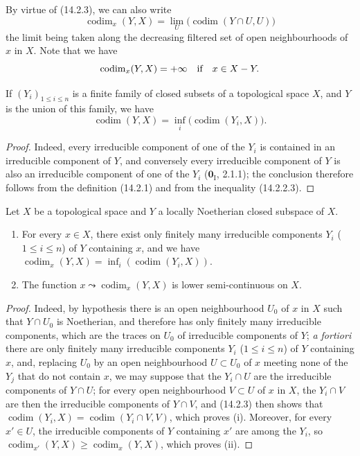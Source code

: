By virtue of (14.2.3), we can also write
\[
  \operatorname{codim}_x(Y,X)=
  \lim_U\bigl(\operatorname{codim}(Y\cap U,U)\bigr)
  \tag{14.2.4.1}\label{0.14.2.4.1}
\]
the limit being taken along the decreasing filtered set of open
neighbourhoods of $x$ in $X$. Note that we have
\[
  \operatorname{codim}_x(Y,X)=+\infty\quad\text{if}\quad x\in X- Y.
\]

\begin{proposition}[14.2.5]
\label{0.14.2.5}
If $(Y_i)_{1\leq i\leq n}$ is a finite family of closed subsets of a
topological space $X$, and $Y$ is the union of this family, we have
\[
  \operatorname{codim}(Y,X)=
  \inf_i\bigl(\operatorname{codim}(Y_i,X)\bigr).
  \tag{14.2.5.1}\label{0.14.2.5.1}
\]
\end{proposition}

\begin{proof}
Indeed, every irreducible component of one of the $Y_i$ is contained in
an irreducible component of $Y$, and conversely every irreducible
component of $Y$ is also an irreducible component of one of the $Y_i$
($\mathbf{0}_{\mathrm I}$, 2.1.1); the conclusion therefore follows from the definition
(14.2.1) and from the inequality (14.2.2.3).
\end{proof}

\begin{corollary}[14.2.6]
\label{0.14.2.6}
Let $X$ be a topological space and $Y$ a locally Noetherian closed
subspace of $X$.
\begin{enumerate}
  \item[\rm(i)] For every $x\in X$, there exist only finitely many
  irreducible components $Y_i$ \textup{($1\leq i\leq n$)} of $Y$ containing $x$,
  and we have
  $\operatorname{codim}_x(Y,X)=
  \inf_i(\operatorname{codim}(Y_i,X))$.
  \item[\rm(ii)] The function
  $x\leadsto\operatorname{codim}_x(Y,X)$ is lower semi-continuous
  on $X$.
\end{enumerate}
\end{corollary}

\begin{proof}
Indeed, by hypothesis there is an open neighbourhood $U_0$ of $x$ in $X$ such
that $Y\cap U_0$ is Noetherian, and therefore has only finitely many irreducible
components, which are the traces on $U_0$ of irreducible components of $Y$;
\emph{a fortiori} there are only finitely many irreducible components
$Y_i$ ($1\leq i\leq n$) of $Y$ containing $x$, and, replacing $U_0$
by an open neighbourhood $U\subset U_0$ of $x$ meeting none of the $Y_j$
that do not contain $x$, we may suppose that the $Y_i\cap U$ are the irreducible
components of $Y\cap U$; for every open neighbourhood $V\subset U$ of $x$
in $X$, the $Y_i\cap V$ are then the irreducible components of
$Y\cap V$, and (14.2.3) then shows that
$\operatorname{codim}(Y_i,X)=\operatorname{codim}(Y_i\cap V,V)$, which
proves (i). Moreover, for every $x'\in U$, the irreducible components of
$Y$ containing $x'$ are among the $Y_i$, so
$\operatorname{codim}_{x'}(Y,X)\geq\operatorname{codim}_x(Y,X)$, which
proves (ii).
\end{proof}

